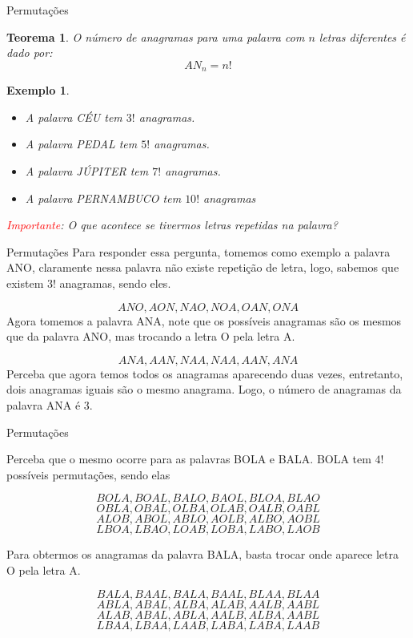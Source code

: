 \documentclass{beamer}
\newtheorem{teorema}{Teorema}
\newtheorem{exemplo}{Exemplo}
\begin{document}
\begin{frame}{Permutações}
\begin{teorema}
    O número de anagramas para uma palavra com $n$ letras diferentes é dado por:
    $$AN_n = n!$$
\end{teorema}

\begin{exemplo}
    \begin{itemize}
        \item A palavra CÉU tem $3!$ anagramas.
        \item A palavra PEDAL tem $5!$ anagramas.
        \item A palavra JÚPITER tem $7!$ anagramas.
        \item A palavra PERNAMBUCO tem $10!$ anagramas
    \end{itemize}
    \textcolor{red}{Importante}: O que acontece se tivermos letras repetidas na palavra?
\end{exemplo}
\end{frame}

\begin{frame}{Permutações}
    Para responder essa pergunta, tomemos como exemplo a palavra ANO, claramente nessa palavra não existe repetição de letra, logo, sabemos que existem $3!$ anagramas, sendo eles.

    $$ANO, AON, NAO, NOA, OAN, ONA $$
\pause    
    Agora tomemos a palavra ANA, note que os possíveis anagramas são os mesmos que da palavra ANO, mas trocando a letra O pela letra A. 

   $$ ANA, AAN, NAA, NAA, AAN, ANA$$
\pause
    Perceba que agora temos todos os anagramas aparecendo duas vezes, entretanto, dois anagramas iguais são o mesmo anagrama. Logo, o número de anagramas da palavra ANA é 3.
\end{frame}

\begin{frame}{Permutações}

Perceba que o mesmo ocorre para as palavras BOLA e BALA. BOLA tem $4!$ possíveis permutações, sendo elas

$$BOLA, BOAL, BALO, BAOL, BLOA, BLAO$$
$$OBLA, OBAL, OLBA, OLAB, OALB, OABL$$
$$ALOB, ABOL, ABLO, AOLB, ALBO, AOBL$$
$$LBOA, LBAO, LOAB, LOBA, LABO, LAOB $$

\pause
Para obtermos os anagramas da palavra BALA, basta trocar onde aparece letra O pela letra A. 

$$BALA, BAAL, BALA, BAAL, BLAA, BLAA$$
$$ABLA, ABAL, ALBA, ALAB, AALB, AABL$$
$$ALAB, ABAL, ABLA, AALB, ALBA, AABL$$
$$LBAA, LBAA, LAAB, LABA, LABA, LAAB $$
\end{frame}
\end{document}
